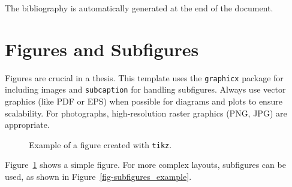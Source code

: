 \documentclass{article}
\begin{document}
The bibliography is automatically generated at the end of the document.

\section{Figures and Subfigures}\label{sec-figures}

Figures are crucial in a thesis. This template uses the
\texttt{graphicx} package for including images and \texttt{subcaption}
for handling subfigures. Always use vector graphics (like PDF or EPS)
when possible for diagrams and plots to ensure scalability. For
photographs, high-resolution raster graphics (PNG, JPG) are appropriate.

\begin{figure}


\caption{\label{fig-tikz_example}Example of a figure created with
\texttt{tikz}.}

\end{figure}%

Figure~\ref{fig-tikz_example} shows a simple figure. For more complex
layouts, subfigures can be used, as shown in
Figure~\ref{fig-subfigures_example}.
\end{document}
